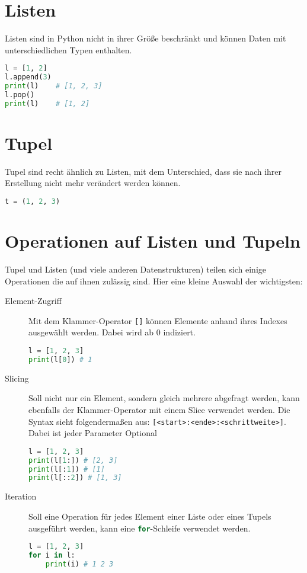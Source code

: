 \documentclass[columns=3]{cheatsheet}
\begin{document}
\section{Listen}
Listen sind in Python nicht in ihrer Größe beschränkt und können Daten mit unterschiedlichen Typen enthalten.
\begin{lstlisting}[language=python]
l = [1, 2]
l.append(3)
print(l)    # [1, 2, 3]
l.pop()
print(l)    # [1, 2]
\end{lstlisting}

\section{Tupel}
Tupel sind recht ähnlich zu Listen, mit dem Unterschied, dass sie nach ihrer Erstellung nicht mehr verändert
werden können.
\begin{lstlisting}[language=python]
t = (1, 2, 3)
\end{lstlisting}

\section{Operationen auf Listen und Tupeln}
Tupel und Listen (und viele anderen Datenstrukturen) teilen sich einige Operationen die auf ihnen zulässig sind.
Hier eine kleine Auswahl der wichtigsten:

\begin{description}
	\item[Element-Zugriff] Mit dem Klammer-Operator \texttt{[]} können Elemente anhand ihres Indexes ausgewählt werden.
		Dabei wird ab 0 indiziert.
		\begin{lstlisting}[language=python]
l = [1, 2, 3]
print(l[0]) # 1
		\end{lstlisting}

	\item[Slicing] Soll nicht nur ein Element, sondern gleich mehrere abgefragt werden, kann ebenfalls der Klammer-Operator
		mit einem Slice verwendet werden. Die Syntax sieht folgendermaßen aus: \texttt{[<start>:<ende>:<schrittweite>]}.
		Dabei ist jeder Parameter Optional
		\begin{lstlisting}[language=python]
l = [1, 2, 3]
print(l[1:]) # [2, 3]
print(l[:1]) # [1]
print(l[::2]) # [1, 3]
		\end{lstlisting}

	\item[Iteration] Soll eine Operation für jedes Element einer Liste oder eines Tupels ausgeführt werden, kann eine
		\lstinline[language=python]{for}-Schleife verwendet werden.
		\begin{lstlisting}[language=python]
l = [1, 2, 3]
for i in l:
	print(i) # 1 2 3
		\end{lstlisting}
\end{description}
\end{document}

